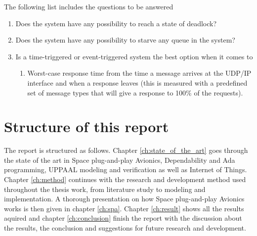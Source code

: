 The following list includes the questions to be answered
\begin{enumerate}
    \item Does the system have any possibility to reach a state of deadlock?
    \item Does the system have any possibility to starve any queue in the
        system?
    \item Is a time-triggered or event-triggered system the best option when it comes to
        \begin{enumerate}
            \item Worst-case response time from the time a message arrives at
                the UDP/IP interface and when a response leaves (this is
                measured with a predefined set of message types that will give
                a response to 100\% of the requests).
        \end{enumerate}
\end{enumerate}

\section{Structure of this report}
The report is structured as follows. Chapter \ref{ch:state_of_the_art} goes
through the state of the art in Space plug-and-play Avionics, Dependability and
Ada programming, UPPAAL modeling and verification as well as Internet of
Things.  Chapter \ref{ch:method} continues with the research and development
method used throughout the thesis work, from literature study to modeling and
implementation. A thorough presentation on how Space plug-and-play Avionics
works is then given in chapter \ref{ch:spa}. Chapter \ref{ch:result} shows all
the results aquired and chapter \ref{ch:conclusion} finish the report with the
discussion about the results, the conclusion and suggestions for future
research and development.

